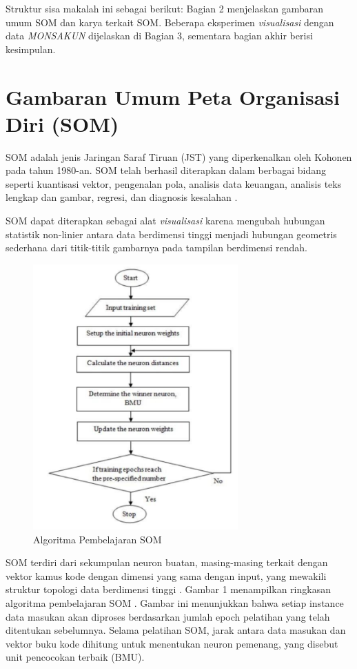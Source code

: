     Struktur sisa makalah ini sebagai berikut: Bagian 2 menjelaskan gambaran umum SOM dan karya terkait SOM. Beberapa eksperimen \textit{visualisasi} dengan data \textit{MONSAKUN} dijelaskan di Bagian 3, sementara bagian akhir berisi kesimpulan.

\section{Gambaran Umum Peta Organisasi Diri (SOM)}

    SOM adalah jenis Jaringan Saraf Tiruan (JST) yang diperkenalkan oleh Kohonen \citep{Kohonen1998} pada tahun 1980-an. SOM telah berhasil diterapkan dalam berbagai bidang seperti kuantisasi vektor, pengenalan pola, analisis data keuangan, analisis teks lengkap dan gambar, regresi, dan diagnosis kesalahan \citep{Jin2004}.

    SOM dapat diterapkan sebagai alat \textit{visualisasi} \citep{Dragomir2014} karena mengubah hubungan statistik non-linier antara data berdimensi tinggi menjadi hubungan geometris sederhana dari titik-titik gambarnya pada tampilan berdimensi rendah.

    \begin{figure}[H]
        \centering
        \includegraphics[width=0.7\textwidth]{Gambar/gambar5.1.png}
        \caption{Algoritma Pembelajaran SOM}
    \end{figure}

    SOM terdiri dari sekumpulan neuron buatan, masing-masing terkait dengan vektor kamus kode dengan dimensi yang sama dengan input, yang mewakili struktur topologi data berdimensi tinggi \citep{Cabanes2012}. Gambar 1 menampilkan ringkasan algoritma pembelajaran SOM \citep{Fuertes2010}. Gambar ini menunjukkan bahwa setiap instance data masukan akan diproses berdasarkan jumlah epoch pelatihan yang telah ditentukan sebelumnya. Selama pelatihan SOM, jarak antara data masukan dan vektor buku kode dihitung untuk menentukan neuron pemenang, yang disebut unit pencocokan terbaik (BMU).


